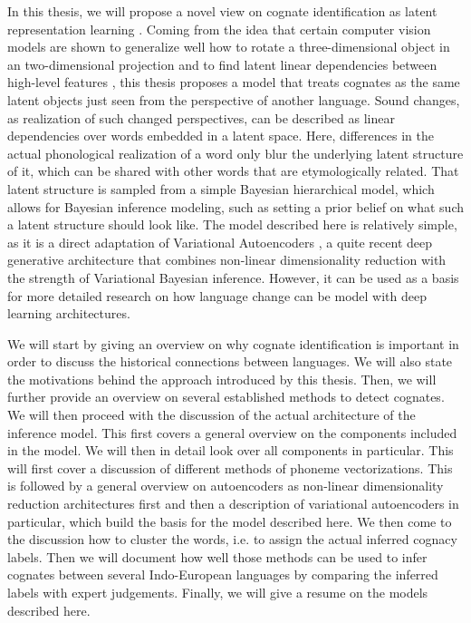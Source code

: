 \documentclass[6pt]{article}
\begin{document}
In this thesis, we will propose a novel view on cognate identification as latent representation learning \citep{bengio2013representation,Goodfellow-et-al-2016-Book}. Coming from the idea that certain computer vision models are shown to generalize well how to rotate a three-dimensional object in an two-dimensional projection and to find latent linear dependencies between high-level features \citep{radford2015unsupervised,dosovitskiy2015learning}, this thesis proposes a model that treats cognates as the same latent objects just seen from the perspective of another language. Sound changes, as realization of such changed perspectives, can be described as linear dependencies over words embedded in a latent space. Here, differences in the actual phonological realization of a word only blur the underlying latent structure of it, which can be shared with other words that are etymologically related. That latent structure is sampled from a simple Bayesian hierarchical model, which allows for Bayesian inference modeling, such as setting a prior belief on what such a latent structure should look like. The model described here is relatively simple, as it is a direct adaptation of Variational Autoencoders \citep{kingma2013auto}, a quite recent deep generative architecture that combines non-linear dimensionality reduction with the strength of Variational Bayesian inference. However, it can be used as a basis for more detailed research on how language change can be model with deep learning architectures. 


We will start by giving an overview on why cognate identification is important in order to discuss the historical connections between languages. We will also state the motivations behind the approach introduced by this thesis. Then, we will further provide an overview on several established methods to detect cognates. We will then proceed with the  discussion of the actual architecture of the inference model. This first covers a general overview on the components included in the model. We will then in detail look over all components in particular. This will first cover a discussion of different methods of phoneme vectorizations. This is followed by a general overview on autoencoders as non-linear dimensionality reduction architectures first and then a description of variational autoencoders in particular, which build the basis for the model described here. We then come to the discussion how to cluster the words, i.e. to assign the actual inferred cognacy labels. Then we will document how well those methods can be used to infer cognates between several Indo-European languages by comparing the inferred labels with expert judgements. 
Finally, we will give a resume on the models described here.
\end{document}
